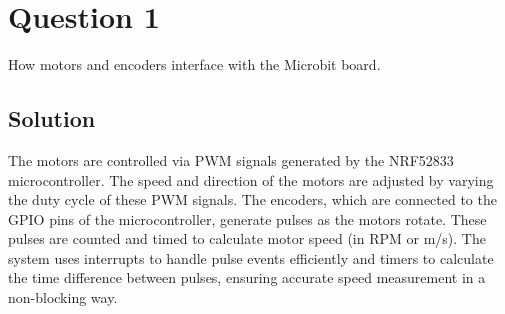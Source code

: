 \section*{Question 1}

How motors and encoders interface with the Microbit board.

\subsection*{Solution}

The motors are controlled via PWM signals generated by the NRF52833 microcontroller.
The speed and direction of the motors are adjusted by varying the duty cycle of these PWM signals.
The encoders, which are connected to the GPIO pins of the microcontroller, generate pulses as the motors rotate.
These pulses are counted and timed to calculate motor speed (in RPM or m/s).
The system uses interrupts to handle pulse events efficiently and timers to calculate the time difference between pulses, ensuring accurate speed measurement in a non-blocking way.
